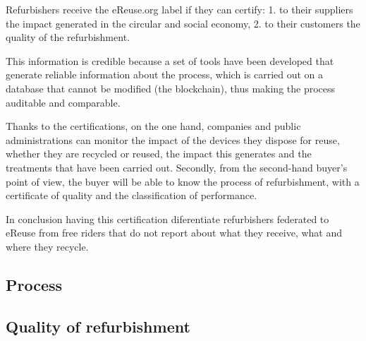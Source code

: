 \documentclass[
]{book}
\begin{document}
Refurbishers receive the eReuse.org label if they can certify: 1. to their suppliers the impact generated in the circular and social economy, 2. to their customers the quality of the refurbishment.

This information is credible because a set of tools have been developed that generate reliable information about the process, which is carried out on a database that cannot be modified (the blockchain), thus making the process auditable and comparable.

Thanks to the certifications, on the one hand, companies and public administrations can monitor the impact of the devices they dispose for reuse, whether they are recycled or reused, the impact this generates and the treatments that have been carried out. Secondly, from the second-hand buyer's point of view, the buyer will be able to know the process of refurbishment, with a certificate of quality and the classification of performance.

In conclusion having this certification diferentiate refurbishers federated to eReuse from free riders that do not report about what they receive, what and where they recycle.

\hypertarget{process}{%
\subsection{Process}\label{process}}

\hypertarget{quality-of-refurbishment}{%
\subsection{Quality of refurbishment}\label{quality-of-refurbishment}}
\end{document}
